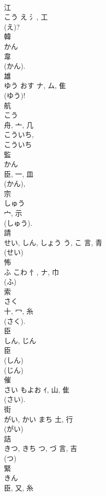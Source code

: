 \documentclass[8pt]{extreport}
\begin{document}
\begin{CJK}{UTF8}{min}
\\	江	
\\	こう	え	氵, 工	
\\	(え)? 
\\	韓	
\\	かん	
\\	韋		
\\	(かん). 
\\	雄	
\\	ゆう	おす	ナ, ム, 隹	
\\	(ゆう)! 
\\	航	
\\	こう	
\\	舟, 亠, 几	
\\	こういち, 
\\	こういち 
\\	監	
\\	かん	
\\	臣, 一, 皿		
\\	(かん), 
\\	宗	
\\	しゅう	
\\	宀, 示	
\\	(しゅう). 
\\	請	
\\	せい, しん, しょう	う, こ	言, 青	
\\	(せい) 
\\	怖	
\\	ふ	こわ	忄, ナ, 巾	
\\	(ふ) 
\\	索	
\\	さく	
\\	十, 冖, 糸	
\\	(さく). 
\\	臣	
\\	しん, じん	
\\	臣	
\\	(しん) 
\\	(じん) 
\\	催	
\\	さい	もよお	ｲ, 山, 隹	
\\	(さい). 
\\	街	
\\	がい, かい	まち	土, 行	
\\	(がい) 
\\	詰	
\\	きつ, きち	つ, づ	言, 吉	
\\	(つ) 
\\	緊	
\\	きん	
\\	臣, 又, 糸	

\end{CJK}
\end{document}

